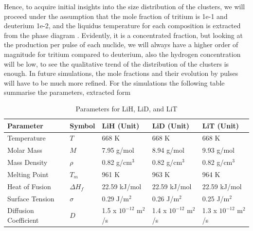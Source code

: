 Hence, to acquire initial insights into the size distribution of the clusters, we will proceed under 
the assumption that the mole fraction of tritium is 1e-1 and deuterium 1e-2, and the liquidus temperature for each composition is extracted from the phase diagram \cite{Veleckis1977}.
Evidently, it is a concentrated fraction, but looking at the production per pulse of each nuclide, we will always have a higher order of magnitude for tritium 
compared to deuterium, also the hydrogen concentration will be low, to see the qualitative trend of the distribution of the clusters is enough. In future simulations, the mole fractions and their evolution by pulses will have to be much more refined.
For the simulations the following table summarise the parameters, extracted form \cite{Konstantin,Veleckis1974THELH,Smith1979,Wang2012,Katsuta1977,Veleckis1977}
\begin{table}[h]
    \centering
    \begin{tabular}{|l|l|l|l|l|}
    \hline
    \textbf{Parameter} & \textbf{Symbol} & \textbf{LiH (Unit)} & \textbf{LiD (Unit)} & \textbf{LiT (Unit)} \\ \hline
    Temperature        & $T$             & 668 K              & 668 K             & 668 K             \\ \hline
    Molar Mass         & $M$             & 7.95 g/mol         & 8.94 g/mol        & 9.93 g/mol        \\ \hline
    Mass Density       & $\rho$          & 0.82 g/cm$^3$      & 0.82 g/cm$^3$     & 0.82 g/cm$^3$     \\ \hline
    Melting Point      & $T_m$           & 961 K              & 963 K             & 964 K             \\ \hline
    Heat of Fusion     & $\Delta H_f$    & 22.59 kJ/mol       & 22.59 kJ/mol        & 22.59 kJ/mol        \\ \hline
    Surface Tension    & $\sigma$        & 0.29 J/m$^2$        & 0.26 J/m$^2$      & 0.25 J/m$^2$      \\ \hline
    Diffusion Coefficient & $D$          & 1.5 x $10^{-12}$ m$^2$/s & 1.4 x $10^{-12}$ m$^2$/s & 1.3 x $10^{-12}$ m$^2$/s \\ \hline
    \end{tabular}
    \caption{Parameters for LiH, LiD, and LiT}
    \label{tab:params_LiHDT}
\end{table}

